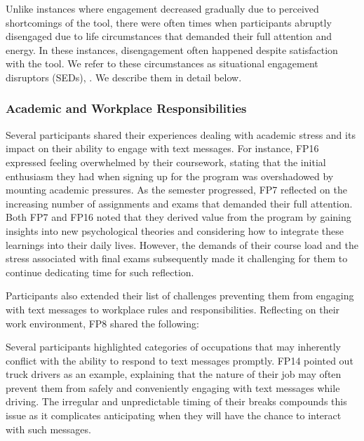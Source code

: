 Unlike instances where engagement decreased gradually due to perceived shortcomings of the tool, there were often times when participants abruptly disengaged due to life circumstances that demanded their full attention and energy. In these instances, disengagement often happened despite satisfaction with the tool. We refer to these circumstances as situational engagement disruptors (SEDs), . We describe them in detail below.



\subsubsection{Academic and Workplace Responsibilities}

Several participants shared their experiences dealing with academic stress and its impact on their ability to engage with text messages. For instance, FP16 expressed feeling overwhelmed by their coursework, stating that the initial enthusiasm they had when signing up for the program was overshadowed by mounting academic pressures. As the semester progressed, FP7 reflected on the increasing number of assignments and exams that demanded their full attention. Both FP7 and FP16 noted that they derived value from the program by gaining insights into new psychological theories and considering how to integrate these learnings into their daily lives. However, the demands of their course load and the stress associated with final exams subsequently made it challenging for them to continue dedicating time for such reflection.


Participants also extended their list of challenges preventing them from engaging with text messages to workplace rules and responsibilities. Reflecting on their work environment, FP8 shared the following:


\noindent
Several participants highlighted categories of occupations that may inherently conflict with the ability to respond to text messages promptly. FP14 pointed out truck drivers as an example, explaining that the nature of their job may often prevent them from safely and conveniently engaging with text messages while driving. The irregular and unpredictable timing of their breaks compounds this issue as it complicates anticipating when they will have the chance to interact with such messages.

